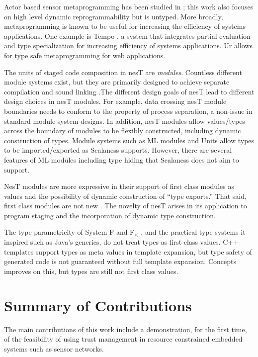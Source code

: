 Actor based sensor metaprogramming has been studied in \cite{cheong07}; this work also focuses
on high level dynamic reprogrammability but is untyped. More broadly, metaprogramming is known
to be useful for increasing the efficiency of systems applications. One example is Tempo
\cite{289140}, a system that integrates partial evaluation and type specialization for
increasing efficiency of systems applications. Ur \cite{UrPLDI10} allows for type safe
metaprogramming for web applications.

The units of staged code composition in nesT are \emph{modules}. Countless different module
systems exist, but they are primarily designed to achieve separate compilation and sound linking
\cite{Cardelli-1997}.The different design goals of nesT lead to different design choices in nesT
modules. For example, data crossing nesT module boundaries needs to conform to the property of
process separation, a non-issue in standard module system designs. In addition, nesT modules
allow values/types across the boundary of modules to be flexibly constructed, including dynamic
construction of types. Module systems such as ML modules \cite{macqueen84} and Units
\cite{flatt98units} allow types to be imported/exported as Scalaness supports. However, there
are several features of ML modules including type hiding that Scalaness does not aim to support.

NesT modules are more expressive in their support of first class modules as values and the
possibility of dynamic construction of ``type exports.'' That said, first class modules are not
new \cite{99620,ancona01calculus}. The novelty of nesT arises in its application to program
staging and the incorporation of dynamic type construction.

The type parametricity of System F and F$_\le$ \cite{Cardelli-1985}, and the practical type
systems it inspired such as Java's generics, do not treat types as first class values. C++
templates support types as meta values in template expansion, but type safety of generated code
is not guaranteed without full template expansion. Concepts \cite{gregor06:_concepts} improves
on this, but types are still not first class values.

\section{Summary of Contributions}

The main contributions of this work include a demonstration, for the first time, of the
feasibility of using trust management in resource constrained embedded systems such as sensor
networks.


